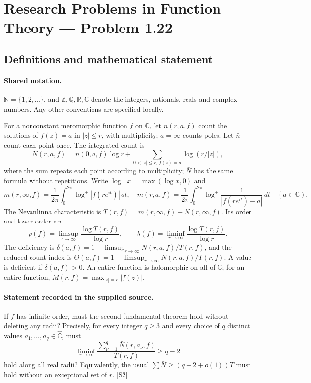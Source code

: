 \documentclass[11pt]{article}
\newcommand{\sref}[2]{\hyperlink{source:#1:#2}{[S#2]}}
\begin{document}
\section{Research Problems in Function Theory — Problem 1.22}\label{statement}

\subsection{Definitions and mathematical statement}

\paragraph{Shared notation.}$\mathbb N=\{1,2,\ldots\}$, and $\mathbb Z,\mathbb Q,\mathbb R,\mathbb C$ denote the integers, rationals, reals and complex numbers. Any other conventions are specified locally.


For a nonconstant meromorphic function $f$ on $\mathbb C$, let $n(r,a,f)$ count the solutions of $f(z)=a$ in $|z|\le r$, with multiplicity; $a=\infty$ counts poles. Let $\bar n$ count each point once. The integrated count is
\[
 N(r,a,f)=n(0,a,f)\log r+\sum_{0<|z|\le r,\ f(z)=a}\log(r/|z|),
\]
where the sum repeats each point according to multiplicity; $\bar N$ has the same formula without repetitions. Write $\log^+x=\max(\log x,0)$ and
\[
 m(r,\infty,f)=\frac1{2\pi}\int_0^{2\pi}\log^+|f(re^{it})|\,dt,\quad
 m(r,a,f)=\frac1{2\pi}\int_0^{2\pi}\log^+\frac1{|f(re^{it})-a|}\,dt\quad(a\in\mathbb C).
\]
The Nevanlinna characteristic is $T(r,f)=m(r,\infty,f)+N(r,\infty,f)$. Its order and lower order are
\[
 \rho(f)=\limsup_{r\to\infty}\frac{\log T(r,f)}{\log r},\qquad
 \lambda(f)=\liminf_{r\to\infty}\frac{\log T(r,f)}{\log r}.
\]
The deficiency is $\delta(a,f)=1-\limsup_{r\to\infty}N(r,a,f)/T(r,f)$, and the reduced-count index is $\Theta(a,f)=1-\limsup_{r\to\infty}\bar N(r,a,f)/T(r,f)$. A value is deficient if $\delta(a,f)>0$. An entire function is holomorphic on all of $\mathbb C$; for an entire function, $M(r,f)=\max_{|z|=r}|f(z)|$.
\paragraph{Statement recorded in the supplied source.}
If $f$ has infinite order, must the second fundamental theorem hold without deleting any radii? Precisely, for every integer $q\ge3$ and every choice of $q$ distinct values $a_1,\ldots,a_q\in\widehat{\mathbb C}$, must
\[
 \liminf_{r\to\infty}\frac{\sum_{\nu=1}^{q}\bar N(r,a_\nu,f)}{T(r,f)}\ge q-2
\]
hold along all real radii? Equivalently, the usual $\sum\bar N\ge(q-2+o(1))T$ must hold without an exceptional set of $r$. \sref{statement}{2}
\end{document}
